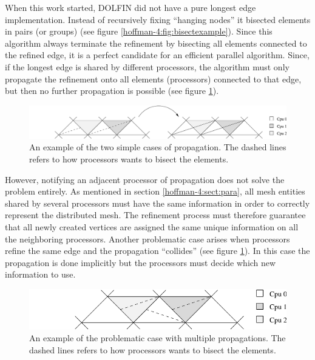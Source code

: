 When this work started, DOLFIN did not have a pure longest edge
implementation. Instead of recursively fixing ``hanging nodes'' it
bisected elements in pairs (or groups) (see figure
\ref{hoffman-4:fig:bisectexample}). Since this algorithm always terminate the
refinement by bisecting all elements connected to the refined edge, it
is a perfect candidate for an efficient parallel algorithm. Since, if the
longest edge is shared by different processors, the algorithm must
only propagate the refinement onto all elements (processors) connected
to that edge, but then no further propagation is possible (see figure
\ref{hoffman-4:fig:prop}).
\begin{figure}[htb]
  \begin{center}
    \includegraphics[width=0.95\columnwidth]{chapters/hoffman-4/pdf/prop.pdf}
  \end{center}
   \caption{An example of the two simple cases of propagation. The dashed lines refers to how processors wants to bisect the elements.}
   \label{hoffman-4:fig:prop}
\end{figure}

However, notifying an adjacent processor of propagation does not solve
the problem entirely. As mentioned in section \ref{hoffman-4:sect:para}, all
mesh entities shared by several processors must have the same
information in order to correctly represent the distributed mesh. The
refinement process must therefore guarantee that all newly created
vertices are assigned the same unique information on all the
neighboring processors. Another problematic case arises when
processors refine the same edge and the propagation ``collides'' (see
figure \ref{hoffman-4:fig:prop}). In this case the propagation is done
implicitly but the processors must decide which new information
to use.
\begin{figure}[htb]
  \begin{center}
    \includegraphics[width=0.65\columnwidth]{chapters/hoffman-4/pdf/propprob.pdf}
    \caption{An example of the problematic case with
      multiple propagations. The dashed lines refers to how processors
      wants to bisect the elements.}
    \label{hoffman-4:fig:propprob}
  \end{center}
\end{figure}


